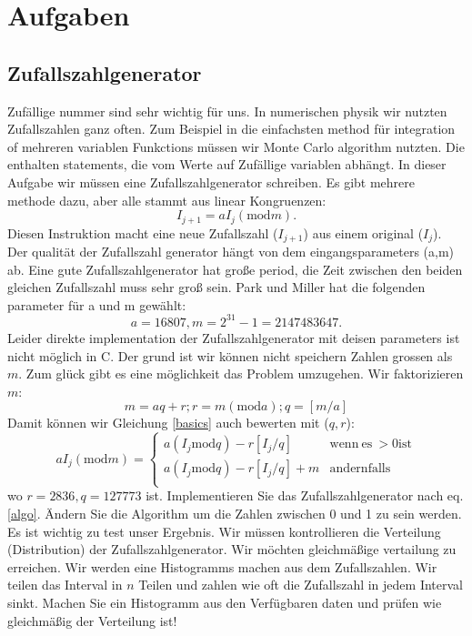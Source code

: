 \documentclass{article}[12pt]
\begin{document}
\section{Aufgaben}
\subsection{Zufallszahlgenerator}
Zufällige nummer sind sehr wichtig für uns. In numerischen physik wir nutzten Zufallszahlen ganz often. Zum Beispiel 
in die einfachsten method für integration of mehreren variablen Funkctions müssen wir Monte Carlo algorithm nutzten. Die
enthalten statements, die vom Werte auf Zufällige variablen abhängt. In dieser Aufgabe wir müssen eine Zufallszahlgenerator
schreiben. Es gibt mehrere methode dazu, aber alle stammt aus linear Kongruenzen:
\begin{equation}
I_{j+1}=a I_{j} \left( \mathrm{mod} m\right).
\label{basics}
\end{equation}
Diesen Instruktion macht eine neue Zufallszahl ($I_{j+1}$)  aus einem original ($I_j$). Der qualität der Zufallszahl generator
hängt von dem eingangsparameters (a,m) ab. Eine gute Zufallszahlgenerator hat große period, die Zeit zwischen den beiden gleichen
Zufallszahl muss sehr groß sein. Park und Miller hat die folgenden parameter für a und m gewählt:
\begin{equation}
a=16807, m=2^{31}-1=2147483647. 
\end{equation}
Leider direkte implementation der Zufallszahlgenerator mit deisen parameters ist nicht möglich in C. Der grund ist
wir können nicht speichern Zahlen grossen als $m$. Zum glück gibt es eine möglichkeit das Problem umzugehen. 
Wir faktorizieren $m$:
\begin{equation}
m= aq + r; r= m \left(\mathrm{mod}a\right); q= \left[m/a\right]
\end{equation}
Damit können wir Gleichung \ref{basics} auch bewerten mit ($q,r$):
\begin{equation}
a I_j \left( \mathrm{mod} m\right)=  
\left\{ \begin{array}{rc}
a\left(I_j \mathrm{mod} q\right) -r \left[I_j/q\right] & \mathrm{wenn~es~}>0\mathrm{ist} \\ 
a\left(I_j \mathrm{mod} q\right) -r \left[I_j/q\right] + m & \mathrm{andernfalls} \\ 
\end{array}\right.
\label{algo}
\end{equation}
wo $r=2836,q=127773$ ist. Implementieren Sie das Zufallszahlgenerator nach eq.\ref{algo}. Ändern Sie die Algorithm
um die Zahlen zwischen 0 und 1 zu sein werden.
Es ist wichtig zu test unser Ergebnis. Wir müssen kontrollieren die Verteilung (Distribution) der Zufallszahlgenerator.
Wir möchten gleichmäßige vertailung zu erreichen. Wir werden eine Histogramms machen aus dem Zufallszahlen. Wir teilen 
das Interval in $n$ Teilen und zahlen wie oft die Zufallszahl in jedem Interval sinkt. Machen Sie ein Histogramm aus 
den Verfügbaren daten und prüfen wie gleichmäßig der Verteilung ist!
\end{document}
